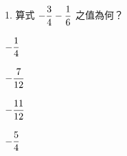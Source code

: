 \documentclass[12pt]{article}
\begin{document}
\begin{problem}
  \item[1.] 算式 $-\fraction{3}{4} - \fraction{1}{6}$ 之值為何？
  \begin{choices}
    \item $-\fraction{1}{4}$
    \item $-\fraction{7}{12}$
    \item $-\fraction{11}{12}$
    \item $-\fraction{5}{4}$
  \end{choices}
\end{problem}
\end{document}
